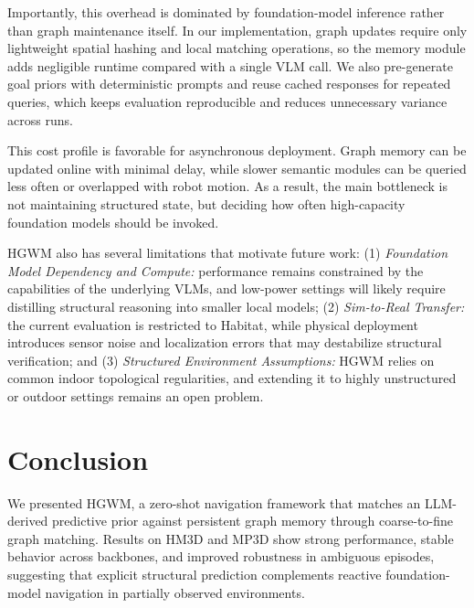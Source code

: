 \documentclass{article}
\begin{document}
Importantly, this overhead is dominated by foundation-model inference rather than graph maintenance itself. In our implementation, graph updates require only lightweight spatial hashing and local matching operations, so the memory module adds negligible runtime compared with a single VLM call. We also pre-generate goal priors with deterministic prompts and reuse cached responses for repeated queries, which keeps evaluation reproducible and reduces unnecessary variance across runs.

This cost profile is favorable for asynchronous deployment. Graph memory can be updated online with minimal delay, while slower semantic modules can be queried less often or overlapped with robot motion. As a result, the main bottleneck is not maintaining structured state, but deciding how often high-capacity foundation models should be invoked.

HGWM also has several limitations that motivate future work: (1) \textit{Foundation Model Dependency and Compute:} performance remains constrained by the capabilities of the underlying VLMs, and low-power settings will likely require distilling structural reasoning into smaller local models; (2) \textit{Sim-to-Real Transfer:} the current evaluation is restricted to Habitat, while physical deployment introduces sensor noise and localization errors that may destabilize structural verification; and (3) \textit{Structured Environment Assumptions:} HGWM relies on common indoor topological regularities, and extending it to highly unstructured or outdoor settings remains an open problem.

\section{Conclusion}

We presented HGWM, a zero-shot navigation framework that matches an LLM-derived predictive prior against persistent graph memory through coarse-to-fine graph matching. Results on HM3D and MP3D show strong performance, stable behavior across backbones, and improved robustness in ambiguous episodes, suggesting that explicit structural prediction complements reactive foundation-model navigation in partially observed environments.

\end{document}

